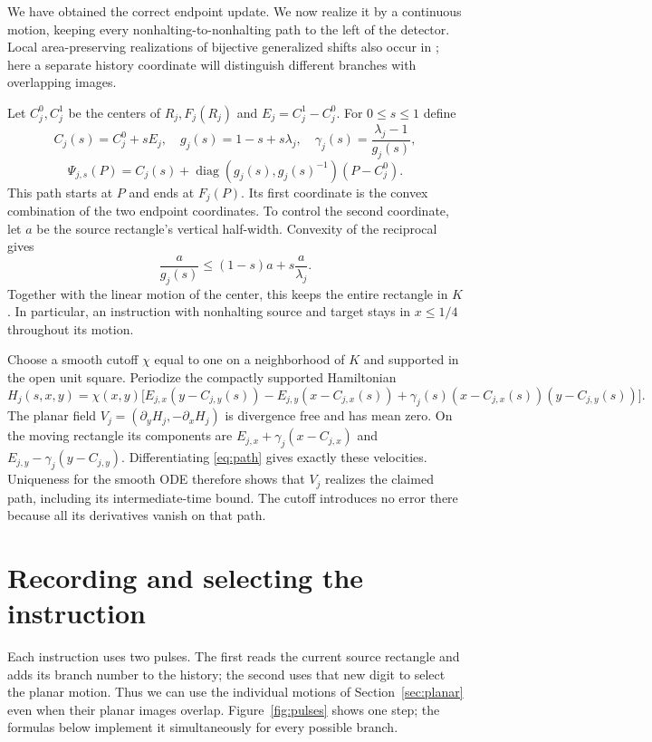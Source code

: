 \documentclass[11pt]{article}
\begin{document}
We have obtained the correct endpoint update. We now realize it by a
continuous motion, keeping every nonhalting-to-nonhalting path to the
left of the detector. Local area-preserving realizations of bijective generalized
shifts also occur in \cite[Proposition~5.1]{CMPP}; here a separate history
coordinate will distinguish different branches with overlapping images.

Let $C_j^0,C_j^1$ be the centers of $R_j,F_j(R_j)$ and
$E_j=C_j^1-C_j^0$. For $0\leq s\leq1$ define
\[
 C_j(s)=C_j^0+sE_j,\quad g_j(s)=1-s+s\lambda_j,
 \quad \gamma_j(s)=\frac{\lambda_j-1}{g_j(s)},
\]
\begin{equation}\label{eq:path}
 \Psi_{j,s}(P)=C_j(s)+
 \operatorname{diag}(g_j(s),g_j(s)^{-1})(P-C_j^0).
\end{equation}
This path starts at $P$ and ends at $F_j(P)$. Its first coordinate is
the convex combination of the two endpoint coordinates. To control the
second coordinate, let $a$ be the source rectangle's vertical half-width.
Convexity of the reciprocal gives
\[
 \frac{a}{g_j(s)}\leq(1-s)a+s\frac{a}{\lambda_j}.
\]
Together with the linear motion of the center, this keeps the entire
rectangle in $K$. In particular, an instruction with nonhalting source
and target stays in $x\leq1/4$ throughout its motion.

Choose a smooth cutoff $\chi$ equal to one on a neighborhood of $K$
and supported in the open unit square. Periodize the compactly supported
Hamiltonian
\[
 H_j(s,x,y)=\chi(x,y)\bigl[
 E_{j,x}(y-C_{j,y}(s))-E_{j,y}(x-C_{j,x}(s))
 +\gamma_j(s)(x-C_{j,x}(s))(y-C_{j,y}(s))\bigr].
\]
The planar field $V_j=(\partial_yH_j,-\partial_xH_j)$ is divergence
free and has mean zero. On the moving rectangle its components are
$E_{j,x}+\gamma_j(x-C_{j,x})$ and
$E_{j,y}-\gamma_j(y-C_{j,y})$. Differentiating \eqref{eq:path} gives
exactly these velocities. Uniqueness for the smooth ODE therefore shows
that $V_j$ realizes the claimed path, including its intermediate-time
bound. The cutoff introduces no error there because all its derivatives
vanish on that path.

\section{Recording and selecting the instruction}\label{sec:recording}

Each instruction uses two pulses. The first reads the current source
rectangle and adds its branch number to the history; the second uses that
new digit to select the planar motion. Thus we can use the individual
motions of Section~\ref{sec:planar} even when their planar images overlap.
Figure~\ref{fig:pulses} shows one step; the formulas below implement it
simultaneously for every possible branch.
\end{document}
